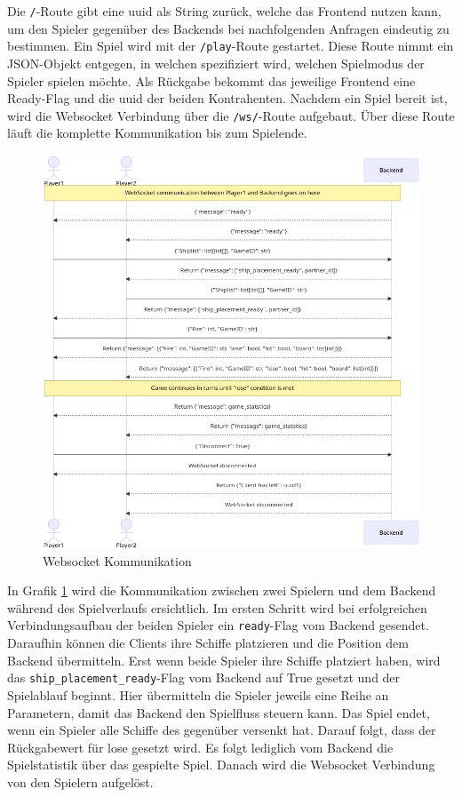 \documentclass[a4paper, 10pt, conference]{IEEEtran}
\begin{document}
Die \texttt{/}-Route gibt eine \ac{uuid} als String zurück, welche das Frontend nutzen kann, um den Spieler gegenüber des Backends bei nachfolgenden Anfragen eindeutig zu bestimmen. Ein Spiel wird mit der \texttt{/play}-Route gestartet. Diese Route nimmt ein JSON-Objekt entgegen, in welchen spezifiziert wird, welchen Spielmodus der Spieler spielen möchte. Als Rückgabe bekommt das jeweilige Frontend eine Ready-Flag und die \ac{uuid} der beiden Kontrahenten. Nachdem ein Spiel bereit ist, wird die Websocket Verbindung über die \texttt{/ws/}-Route aufgebaut. Über diese Route läuft die komplette Kommunikation bis zum Spielende.

\begin{figure}[thp]
    \centering
    \includegraphics[width=\linewidth]{websocket_comm}
    \caption{Websocket Kommunikation}
    \label{fig:websocket_comm}
\end{figure}

In Grafik \ref{fig:websocket_comm} wird die Kommunikation zwischen zwei Spielern und dem Backend während des Spielverlaufs ersichtlich. Im ersten Schritt wird bei erfolgreichen Verbindungsaufbau der beiden Spieler ein \texttt{ready}-Flag vom Backend gesendet. Daraufhin können die Clients ihre Schiffe platzieren und die Position dem Backend übermitteln. Erst wenn beide Spieler ihre Schiffe platziert haben, wird das \texttt{ship\_placement\_ready}-Flag vom Backend auf True gesetzt und der Spielablauf beginnt. Hier übermitteln die Spieler jeweils eine Reihe an Parametern, damit das Backend den Spielfluss steuern kann. Das Spiel endet, wenn ein Spieler alle Schiffe des gegenüber versenkt hat. Darauf folgt, dass der Rückgabewert für lose gesetzt wird. Es folgt lediglich vom Backend die Spielstatistik über das gespielte Spiel. Danach wird die Websocket Verbindung von den Spielern aufgelöst.
\end{document}
